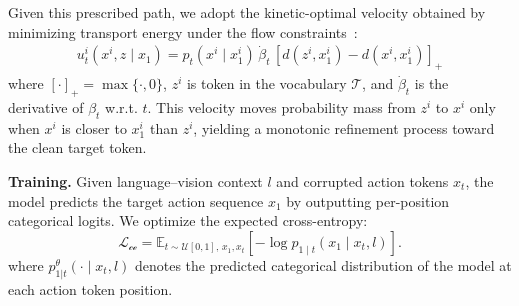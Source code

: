 Given this prescribed path, we adopt the kinetic-optimal velocity obtained by minimizing transport energy under the flow constraints~\citep{wang2025fudoki,deng2025uniform,luo2025next}:
\begin{equation}
\begin{aligned}
u_t^i(x^i, z \mid x_1) = p_t(x^i \mid x_1^i) \, \dot{\beta}_t \, [ d(z^i, x_1^i) - d(x^i, x_1^i) ]_+
\end{aligned} 
\label{eq:ko-verlocity}
\end{equation}
where $[\cdot]_+ = \max\{\cdot, 0\}$,  $z^i$ is token in the vocabulary $\mathcal{T}$, and $\dot{\beta}_t$ is the derivative of $\beta_t$ w.r.t. $t$. This velocity moves probability mass from $z^i$ to $x^i$ only when $x^i$ is closer to $x_1^i$ than $z^i$, yielding a monotonic refinement process toward the clean target token.

\textbf{Training.}  
Given language--vision context $l$ and corrupted action tokens $x_t$, the model predicts the target action sequence $x_1$ by outputting per-position categorical logits. We optimize the expected cross-entropy:
\begin{equation}
\label{eq:training_loss}
\mathcal{L_\text{ce}} = \mathbb{E}_{t \sim \mathcal{U}[0,1],\, {x}_1, {x}_t}
\left[ -\log p_{1 \mid t}\left( {x}_1 \mid {x}_t, {l}\right) \right].
\end{equation}
where $p_{1|t}^{\theta}(\cdot \mid x_t, l)$ denotes the predicted categorical distribution of the model at each action token position.


